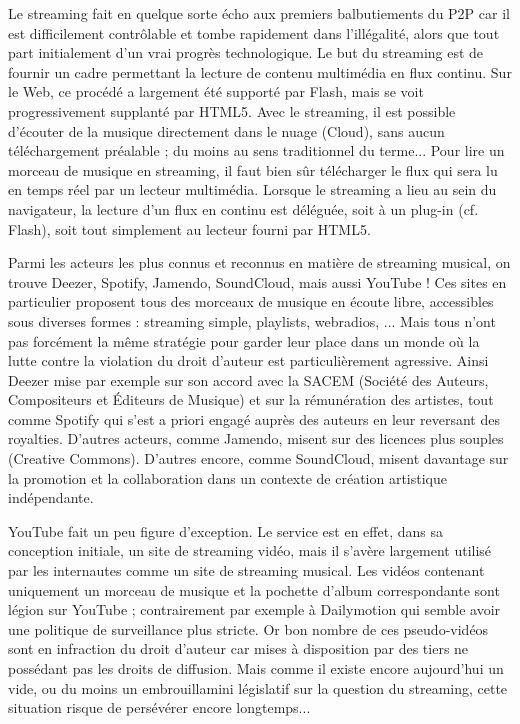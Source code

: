 \documentclass[a4paper,12pt]{article}
\begin{document}
Le streaming fait en quelque sorte écho aux premiers balbutiements du P2P car il est difficilement contrôlable et tombe rapidement dans l'illégalité, alors que tout part initialement d'un vrai progrès technologique. Le but du streaming est de fournir un cadre permettant la lecture de contenu multimédia en flux continu. Sur le Web, ce procédé a largement été supporté par Flash, mais se voit progressivement supplanté par HTML5. Avec le streaming, il est possible d'écouter de la musique directement dans le nuage (Cloud), sans aucun téléchargement préalable ; du moins au sens traditionnel du terme... Pour lire un morceau de musique en streaming, il faut bien sûr télécharger le flux qui sera lu en temps réel par un lecteur multimédia. Lorsque le streaming a lieu au sein du navigateur, la lecture d'un flux en continu est déléguée, soit à un plug-in (cf. Flash), soit tout simplement au lecteur fourni par HTML5.

Parmi les acteurs les plus connus et reconnus en matière de streaming musical, on trouve Deezer, Spotify, Jamendo, SoundCloud, mais aussi YouTube ! Ces sites en particulier proposent tous des morceaux de musique en écoute libre, accessibles sous diverses formes : streaming simple, playlists, webradios, ... Mais tous n'ont pas forcément la même stratégie pour garder leur place dans un monde où la lutte contre la violation du droit d'auteur est particulièrement agressive. Ainsi Deezer mise par exemple sur son accord avec la SACEM (Société des Auteurs, Compositeurs et Éditeurs de Musique) et sur la rémunération des artistes, tout comme Spotify qui s'est a priori engagé auprès des auteurs en leur reversant des royalties. D'autres acteurs, comme Jamendo, misent sur des licences plus souples (Creative Commons). D'autres encore, comme SoundCloud, misent davantage sur la promotion et la collaboration dans un contexte de création artistique indépendante.

YouTube fait un peu figure d'exception. Le service est en effet, dans sa conception initiale, un site de streaming vidéo, mais il s'avère largement utilisé par les internautes comme un site de streaming musical. Les vidéos contenant uniquement un morceau de musique et la pochette d'album correspondante sont légion sur YouTube ; contrairement par exemple à Dailymotion qui semble avoir une politique de surveillance plus stricte. Or bon nombre de ces pseudo-vidéos sont en infraction du droit d'auteur car mises à disposition par des tiers ne possédant pas les droits de diffusion. Mais comme il existe encore aujourd'hui un vide, ou du moins un embrouillamini législatif sur la question du streaming, cette situation risque de persévérer encore longtemps...
\end{document}
